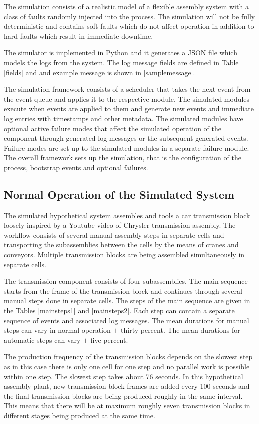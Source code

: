 \documentclass[journal]{IEEEtran}
\begin{document}
The simulation consists of a realistic model of a flexible assembly system with a class of faults randomly injected into the process.
The simulation will not be fully deterministic and contains soft faults which do not affect operation in addition to hard faults which result in immediate downtime.

The simulator is implemented in Python and it generates a JSON file which models the logs from the system. The log message fields are defined in Table \ref{fields} and
and example message is shown in \ref{samplemessage}.

The simulation framework consists of a scheduler that takes the next event from the event queue and applies it to the respective module. The simulated modules
execute when events are applied to them and generate new events and immediate log entries with timestamps and other metadata.
The simulated modules have optional active failure modes that affect the simulated operation of the component through
generated log messages or the subsequent generated events. Failure modes are set up to the simulated modules in a separate failure module.
The overall framework sets up the simulation, that is the configuration of the process, bootstrap events and optional failures.

\subsection{Normal Operation of the Simulated System}
The simulated hypothetical system assembles and tools a car transmission block loosely inspired by a Youtube video of Chrysler transmission assembly\cite{transmission}.
The workflow consists of several manual assembly steps in separate cells and transporting the subassemblies between the cells by the means of
cranes and conveyors. Multiple transmission blocks are being assembled simultaneously in separate cells.

The transmission component consists of four subassemblies. The main sequence starts from the frame of the transmission block
and continues through several manual steps done in separate cells. The steps of the main sequence are given in
the Tables \ref{mainsteps1} and \ref{mainsteps2}.
Each step can contain a separate sequence of events and associated log messages.
The mean durations for manual steps can vary in normal operation $\pm$ thirty percent. The mean durations for automatic steps can vary
$\pm$ five percent.

The production frequency of the transmission blocks depends on the slowest step as in this case there is only one cell for one step and no
parallel work is possible within one step. The slowest step takes about 76 seconds. In this hypothetical assembly plant, new transmission block
frames are added every 100 seconds and the final transmission blocks are being produced roughly in the same interval. This means that there
will be at maximum roughly seven transmission blocks in different stages being produced at the same time.
\end{document}
